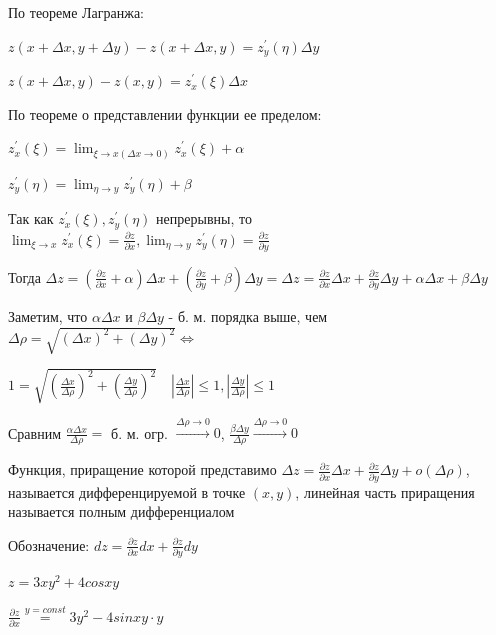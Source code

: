 \documentclass[12pt]{article}
\begin{document}
    По теореме Лагранжа:

    $\displaystyle z(x + \Delta x, y + \Delta y) - z(x + \Delta x, y) = z^\prime_y(\eta) \Delta y$

    $\displaystyle z(x + \Delta x, y) - z(x, y) = z^\prime_x(\xi)\Delta x$

    По теореме о представлении функции ее пределом:

    $\displaystyle z^\prime_x(\xi) = \lim_{\xi \to x (\Delta x \to 0)} z^\prime_x(\xi) + \alpha$

    $\displaystyle z^\prime_y(\eta) = \lim_{\eta \to y} z^\prime_y(\eta) + \beta$

    Так как $\displaystyle z^\prime_x(\xi), z^\prime_y(\eta)$ непрерывны, то $\displaystyle \lim_{\xi \to x} z^\prime_x(\xi) = \frac{\partial z}{\partial x}, \lim_{\eta \to y} z^\prime_y(\eta) = \frac{\partial z}{\partial y}$

    Тогда $\displaystyle \Delta z = \left(\frac{\partial z}{\partial x} + \alpha\right) \Delta x + \left(\frac{\partial z}{\partial y} + \beta\right)\Delta y =
    \Delta z = \frac{\partial z}{\partial x}\Delta x + \frac{\partial z}{\partial y}\Delta y + \alpha \Delta x + \beta \Delta y$

    Заметим, что $\displaystyle \alpha \Delta x$ и $\displaystyle \beta \Delta y$ - б. м. порядка выше, чем $\displaystyle \Delta \rho = \sqrt{(\Delta x)^2 + (\Delta y)^2} \Longleftrightarrow$

    $\displaystyle 1 = \sqrt{\left(\frac{\Delta x}{\Delta \rho}\right)^2 + \left(\frac{\Delta y}{\Delta \rho}\right)^2} \quad |\frac{\Delta x}{\Delta \rho}| \leq 1, |\frac{\Delta y}{\Delta \rho}| \leq 1$

    Сравним $\displaystyle \frac{\alpha \Delta x}{\Delta \rho} =$ б. м. огр. $\displaystyle \stackrel{\Delta \rho \to 0}{\to} 0$, $\displaystyle \frac{\beta \Delta y}{\Delta \rho} \stackrel{\Delta \rho \to 0}{\to} 0$

    Функция, приращение которой представимо $\displaystyle \Delta z = \frac{\partial z}{\partial x}\Delta x + \frac{\partial z}{\partial y}\Delta y + o(\Delta \rho)$, называется дифференцируемой в точке $\displaystyle (x, y)$,
    линейная часть приращения называется полным дифференциалом

    Обозначение: $\displaystyle dz = \frac{\partial z}{\partial x} dx + \frac{\partial z}{\partial y} dy$

    \Ex $\displaystyle z = 3xy^2 + 4cosxy$

    $\displaystyle \frac{\partial z}{\partial x} \stackrel{y = const}{=} 3y^2 - 4sinxy \cdot y$
\end{document}
